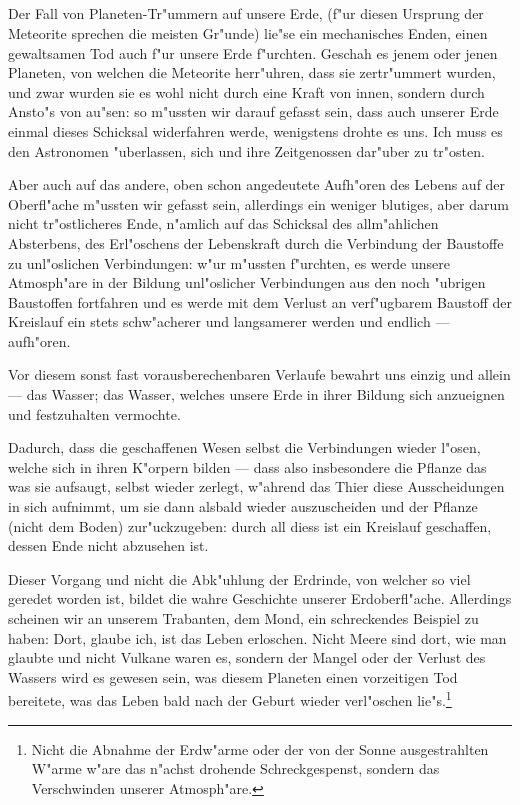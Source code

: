 \documentclass[a4paper, 11pt, oneside]{article}
\begin{document}
\subsection{}
\paragraph{}
Der Fall von Planeten-Tr"ummern auf unsere Erde, (f"ur diesen Ursprung der Meteorite sprechen die meisten Gr"unde) lie"se ein mechanisches Enden, einen gewaltsamen Tod auch f"ur unsere Erde f"urchten. Geschah es jenem oder jenen Planeten, von welchen die Meteorite herr"uhren, dass sie zertr"ummert wurden, und zwar wurden sie es wohl nicht durch eine Kraft von innen, sondern durch Ansto"s von au"sen: so m"ussten wir darauf gefasst sein, dass auch unserer Erde einmal dieses Schicksal widerfahren werde, wenigstens drohte es uns. Ich muss es den Astronomen "uberlassen, sich und ihre Zeitgenossen dar"uber zu tr"osten.

Aber auch auf das andere, oben schon angedeutete Aufh"oren des Lebens auf der Oberfl"ache m"ussten wir gefasst sein, allerdings ein weniger blutiges, aber darum nicht tr"ostlicheres Ende, n"amlich auf das Schicksal des allm"ahlichen Absterbens, des Erl"oschens der Lebenskraft durch die Verbindung der Baustoffe zu unl"oslichen Verbindungen: w"ur m"ussten f"urchten, es werde unsere Atmosph"are in der Bildung unl"oslicher Verbindungen aus den noch "ubrigen Baustoffen fortfahren und es werde mit dem Verlust an verf"ugbarem Baustoff der Kreislauf ein stets schw"acherer und langsamerer werden und endlich --- aufh"oren.

Vor diesem sonst fast vorausberechenbaren Verlaufe bewahrt uns einzig und allein --- das Wasser; das Wasser, welches unsere Erde in ihrer Bildung sich anzueignen und festzuhalten vermochte.

Dadurch, dass die geschaffenen Wesen selbst die Verbindungen wieder l"osen, welche sich in ihren K"orpern bilden --- dass also insbesondere die Pflanze das was sie aufsaugt, selbst wieder zerlegt, w"ahrend das Thier diese Ausscheidungen in sich aufnimmt, um sie dann alsbald wieder auszuscheiden und der Pflanze (nicht dem Boden) zur"uckzugeben: durch all diess ist ein Kreislauf geschaffen, dessen Ende nicht abzusehen ist.

Dieser Vorgang und nicht die Abk"uhlung der Erdrinde, von welcher so viel geredet worden ist, bildet die wahre Geschichte unserer Erdoberfl"ache. Allerdings scheinen wir an unserem Trabanten, dem Mond, ein schreckendes Beispiel zu haben: Dort, glaube ich, ist das Leben erloschen. Nicht Meere sind dort, wie man glaubte und nicht Vulkane waren es, sondern der Mangel oder der Verlust des Wassers wird es gewesen sein, was diesem Planeten einen vorzeitigen Tod bereitete, was das Leben bald nach der Geburt wieder verl"oschen lie"s.\footnote{Nicht die Abnahme der Erdw"arme oder der von der Sonne ausgestrahlten W"arme w"are das n"achst drohende Schreckgespenst, sondern das Verschwinden unserer Atmosph"are.}
\end{document}
